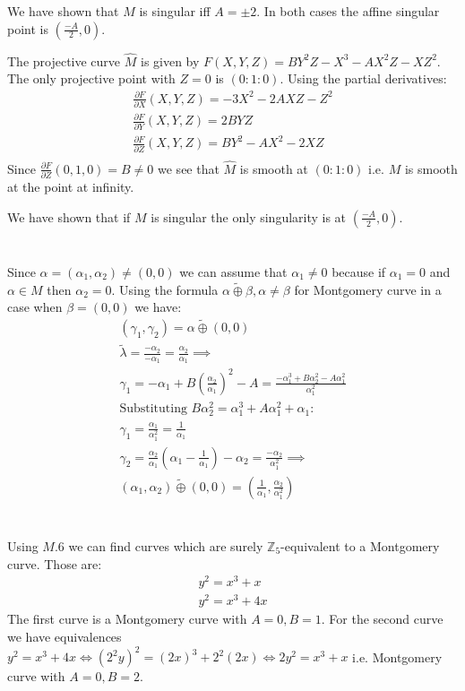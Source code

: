 \documentclass[12pt, a4paper]{article}
\begin{document}
We have shown that $M$ is singular iff $A = \pm 2$. In both cases the affine singular point is $(\frac{-A}{2}, 0)$.

The projective curve $\hat{M}$ is given by $F(X,Y,Z) = BY^2Z-X^3-AX^2Z-XZ^2$. The only projective point with $Z=0$ is $(0:1:0)$. Using the partial derivatives:
\begin{gather*}
\frac{\partial F}{\partial X}(X,Y,Z) = -3X^2-2AXZ-Z^2\\
\frac{\partial F}{\partial Y}(X,Y,Z) = 2BYZ\\
\frac{\partial F}{\partial Z}(X,Y,Z) = BY^2-AX^2-2XZ\\
\end{gather*}
Since $\frac{\partial F}{\partial Z}(0,1,0) = B \neq 0$ we see that $\hat{M}$ is smooth at $(0:1:0)$ i.e. $M$ is smooth at the point at infinity.

We have shown that if $M$ is singular the only singularity is at $(\frac{-A}{2}, 0)$.

\section{}
Since $\alpha = (\alpha_1, \alpha_2) \neq (0,0)$ we can assume that $\alpha_1 \neq 0$ because if $\alpha_1 = 0$ and $\alpha \in M$ then $\alpha_2=0$. Using the formula $\alpha \tilde{\oplus} \beta, \alpha \neq \beta$ for Montgomery curve in a case when $\beta = (0,0)$ we have:
\begin{gather*}
(\gamma_1, \gamma_2) = \alpha \tilde{\oplus} (0,0)\\
\tilde{\lambda} = \frac{-\alpha_2}{-\alpha_1} = \frac{\alpha_2}{\alpha_1} \implies\\
\gamma_1 = -\alpha_1 +B\left(\frac{\alpha_2}{\alpha_1}\right)^2-A = \frac{-\alpha_1^3+B\alpha_2^2-A\alpha_1^2}{\alpha_1^2}\\
\text{Substituting $B\alpha_2^2 = \alpha_1^3+A\alpha_1^2+\alpha_1$:}\\
\gamma_1 = \frac{\alpha_1}{\alpha_1^2} = \frac{1}{\alpha_1}\\
\gamma_2 = \frac{\alpha_2}{\alpha_1}\left(\alpha_1 - \frac{1}{\alpha_1}\right)-\alpha_2 = \frac{-\alpha_2}{\alpha_1^2} \implies\\
(\alpha_1, \alpha_2) \tilde{\oplus} (0,0) = \left(\frac{1}{\alpha_1}, \frac{\alpha_2}{\alpha_1^2}\right)
\end{gather*}

\section{}
Using $M.6$ we can find curves which are surely $\mathbb{Z}_5$-equivalent to a Montgomery curve. Those are:
\begin{gather*}
y^2=x^3+x\\
y^2=x^3+4x
\end{gather*}
The first curve is a Montgomery curve with $A=0, B = 1$. For the second curve we have equivalences $y^2=x^3+4x \iff (2^2y)^2=(2x)^3+2^2(2x) \iff 2y^2=x^3+x$ i.e. Montgomery curve with $A=0, B=2$.
\end{document}
